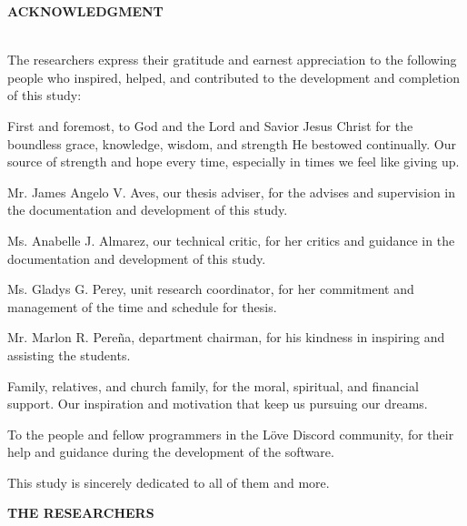 \begin{doublespace}
	\thispagestyle{empty}

	\begin{center}
		\textbf{ACKNOWLEDGMENT}
	\end{center}
	\leavevmode\\

	\justify
	\parx
	The researchers express their gratitude and earnest appreciation to the
	following people who inspired, helped, and contributed to the development
	and completion of this study:

	\parx
	First and foremost, to God and the Lord and Savior Jesus Christ for the
	boundless grace, knowledge, wisdom, and strength He bestowed continually.
	Our source of strength and hope every time, especially in times we feel
	like giving up.

	\parx
	Mr. James Angelo V. Aves, our thesis adviser, for the advises and supervision
	in the documentation and development of this study.

	\parx
	Ms. Anabelle J. Almarez, our technical critic, for her critics and guidance
	in the documentation and development of this study.

	\parx
	Ms. Gladys G. Perey, unit research coordinator, for her commitment and management
	of the time and schedule for thesis.

	\parx
	Mr. Marlon R. Pereña, department chairman, for his kindness in inspiring and
	assisting the students.

	\parx
	Family, relatives, and church family, for the moral, spiritual, and financial
	support. Our inspiration and motivation that keep us pursuing our dreams.

	\parx
	To the people and fellow programmers in the Löve Discord community, for their
	help and guidance during the development of the software.

	\parx
	This study is sincerely dedicated to all of them and more.

	\null\hfill \textbf{THE RESEARCHERS}
\end{doublespace}
